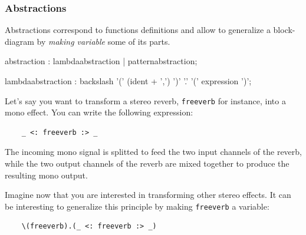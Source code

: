 \subsubsection{Abstractions}

Abstractions correspond to functions definitions and allow to generalize a block-diagram by \textit{making variable} some of its parts. 

% 

\begin{rail}
abstraction : lambdaabstraction | patternabstraction; 
\end{rail}

\begin{rail}
lambdaabstraction :  backslash '(' (ident + ',') ')' '.' '(' expression ')';
\end{rail}

Let's say you want to transform a stereo reverb, \lstinline'freeverb' for instance, into a mono effect. You can write the following expression: 
\begin{lstlisting}
	_ <: freeverb :> _ 
\end{lstlisting}
The incoming mono signal is splitted to feed the two input channels of the reverb, while the two output channels of the reverb are mixed together to produce the resulting mono output.

Imagine now that you are interested in transforming other stereo effects. It can be interesting to generalize this principle by making \lstinline'freeverb' a variable: 
\begin{lstlisting}
	\(freeverb).(_ <: freeverb :> _)
\end{lstlisting}

